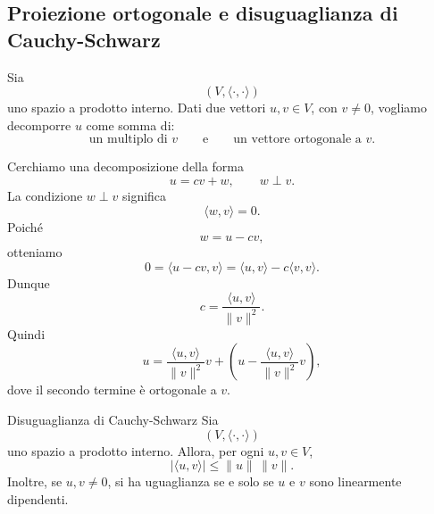 \documentclass[a4paper]{article}
\begin{document}
\subsection{Proiezione ortogonale e disuguaglianza di Cauchy-Schwarz}

Sia
\[
    (V,\langle\cdot,\cdot\rangle)
\]
uno spazio a prodotto interno. Dati due vettori \(u,v\in V\), con \(v\neq 0\), vogliamo decomporre \(u\) come somma di:
\[
    \text{un multiplo di }v
    \qquad
    \text{e}
    \qquad
    \text{un vettore ortogonale a }v.
\]

Cerchiamo una decomposizione della forma
\[
    u=cv+w,
    \qquad
    w\perp v.
\]
La condizione \(w\perp v\) significa
\[
    \langle w,v\rangle=0.
\]
Poiché
\[
    w=u-cv,
\]
otteniamo
\[
    0=\langle u-cv,v\rangle
    =
    \langle u,v\rangle-c\langle v,v\rangle.
\]
Dunque
\[
    c=\frac{\langle u,v\rangle}{\|v\|^2}.
\]
Quindi
\[
    u
    =
    \frac{\langle u,v\rangle}{\|v\|^2}v
    +
    \left(
        u-\frac{\langle u,v\rangle}{\|v\|^2}v
    \right),
\]
dove il secondo termine è ortogonale a \(v\).

\begin{center}
\end{center}

\begin{snippettheorem}{Disuguaglianza di Cauchy-Schwarz}
    Sia
    \[
        (V,\langle\cdot,\cdot\rangle)
    \]
    uno spazio a prodotto interno. Allora, per ogni \(u,v\in V\),
    \[
        |\langle u,v\rangle|
        \leq
        \|u\|\,\|v\|.
    \]
    Inoltre, se \(u,v\neq 0\), si ha uguaglianza se e solo se \(u\) e \(v\) sono linearmente dipendenti.
\end{snippettheorem}
\end{document}
